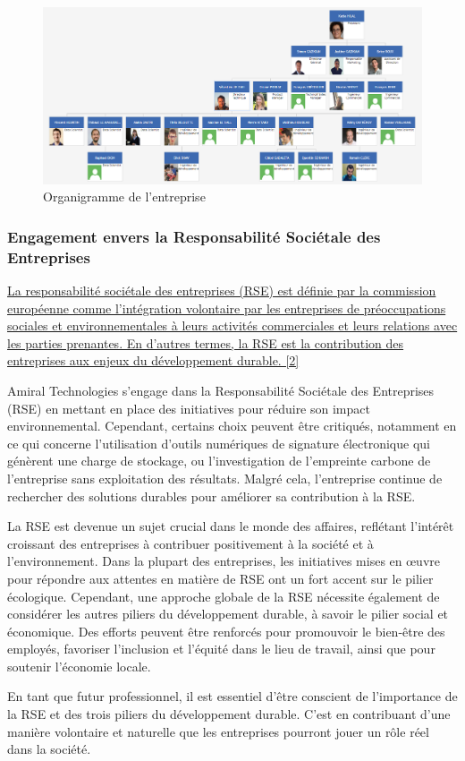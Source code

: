 \begin{figure}[ht!]
    \centering
    \includegraphics[width=\textwidth]{paper/figures/orga.png}
    \caption{Organigramme de l'entreprise}
    \label{fig:organigramme}
\end{figure}


\subsubsection{Engagement envers la Responsabilité Sociétale des Entreprises}
\hyperref[rse]{La responsabilité sociétale des entreprises (RSE) est définie par la commission européenne comme l'intégration volontaire par les entreprises de préoccupations sociales et environnementales à leurs activités commerciales et leurs relations avec les parties prenantes.
En d'autres termes, la RSE est la contribution des entreprises aux enjeux du développement durable. [2]}

Amiral Technologies s'engage dans la Responsabilité Sociétale des Entreprises (RSE) en mettant en place des initiatives pour réduire son impact environnemental.
Cependant, certains choix peuvent être critiqués, notamment en ce qui concerne l'utilisation d'outils numériques de signature électronique qui génèrent une charge de stockage, ou l'investigation de l'empreinte carbone de l'entreprise sans exploitation des résultats.
Malgré cela, l'entreprise continue de rechercher des solutions durables pour améliorer sa contribution à la RSE.

La RSE est devenue un sujet crucial dans le monde des affaires, reflétant l'intérêt croissant des entreprises à contribuer positivement à la société et à l'environnement.
Dans la plupart des entreprises, les initiatives mises en œuvre pour répondre aux attentes en matière de RSE ont un fort accent sur le pilier écologique.
Cependant, une approche globale de la RSE nécessite également de considérer les autres piliers du développement durable, à savoir le pilier social et économique.
Des efforts peuvent être renforcés pour promouvoir le bien-être des employés, favoriser l'inclusion et l'équité dans le lieu de travail, ainsi que pour soutenir l'économie locale.

En tant que futur professionnel, il est essentiel d'être conscient de l'importance de la RSE et des trois piliers du développement durable.
C'est en contribuant d'une manière volontaire et naturelle que les entreprises pourront jouer un rôle réel dans la société.

